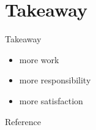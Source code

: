 \documentclass[11pt]{beamer}
\begin{document}
\section{Takeaway}

\begin{frame}{Takeaway}
    \begin{itemize}
        \item more work
              \medskip
        \item more responsibility
              \medskip
        \item more satisfaction
    \end{itemize}
\end{frame}

\begin{frame}[allowframebreaks]{Reference}
    \printbibliography
\end{frame}

\end{document}
